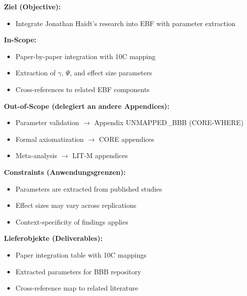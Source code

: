 
\begin{tcolorbox}[
    colback=orange!5!white,
    colframe=orange!75!black,
    title={\textbf{Appendix Scope: Ziel / In-Scope / Out-of-Scope / Constraints}},
    fonttitle=\bfseries
]

\textbf{Ziel (Objective):}
\begin{itemize}[nosep]
    \item Integrate Jonathan Haidt's research into EBF with parameter extraction
\end{itemize}

\textbf{In-Scope:}
\begin{itemize}[nosep]
    \item Paper-by-paper integration with 10C mapping
    \item Extraction of $\gamma$, $\Psi$, and effect size parameters
    \item Cross-references to related EBF components
\end{itemize}

\textbf{Out-of-Scope (delegiert an andere Appendices):}
\begin{itemize}[nosep]
    \item Parameter validation $\rightarrow$ Appendix UNMAPPED_BBB (CORE-WHERE)
    \item Formal axiomatization $\rightarrow$ CORE appendices
    \item Meta-analysis $\rightarrow$ LIT-M appendices
\end{itemize}

\textbf{Constraints (Anwendungsgrenzen):}
\begin{itemize}[nosep]
    \item Parameters are extracted from published studies
    \item Effect sizes may vary across replications
    \item Context-specificity of findings applies
\end{itemize}

\textbf{Lieferobjekte (Deliverables):}
\begin{itemize}[nosep]
    \item Paper integration table with 10C mappings
    \item Extracted parameters for BBB repository
    \item Cross-reference map to related literature
\end{itemize}

\end{tcolorbox}


